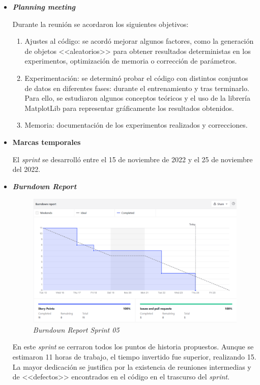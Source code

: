 \begin{itemize}
	\item \textbf{\textit{Planning meeting}}
	
	Durante la reunión se acordaron los siguientes objetivos:
	
	\begin{enumerate}
		\item Ajustes al código: se acordó mejorar algunos factores, como la generación de objetos <<aleatorios>> para obtener resultados deterministas en los experimentos, optimización de memoria o corrección de parámetros.
		\item Experimentación: se determinó probar el código con distintos conjuntos de datos en diferentes fases: durante el entrenamiento y tras terminarlo. Para ello, se estudiaron algunos conceptos teóricos y el uso de la librería MatplotLib para representar gráficamente los resultados obtenidos.
		\item Memoria: documentación de los experimentos realizados y correcciones.
	\end{enumerate}

	\item \textbf{Marcas temporales}		
	
	El \textit{sprint} se desarrolló entre el 15 de noviembre de 2022 y el 25 de noviembre del 2022.
	
	\item \textbf{\textit{Burndown Report}}
		\begin{figure}[h]
		\caption[\textit{Sprint} 05: \textit{burndown report}]{\textit{Burndown Report Sprint 05}}
		\centering
		\includegraphics[width=\textwidth]{../img/anexos/bdr/s05_bdr}
	\end{figure}
	
	En este \textit{sprint} se cerraron todos los puntos de historia propuestos. Aunque se estimaron 11 horas de trabajo, el tiempo invertido fue superior, realizando 15. La mayor dedicación se justifica por la existencia de reuniones intermedias y de <<defectos>> encontrados en el código en el trascurso del \textit{sprint}.
	

\end{itemize}
